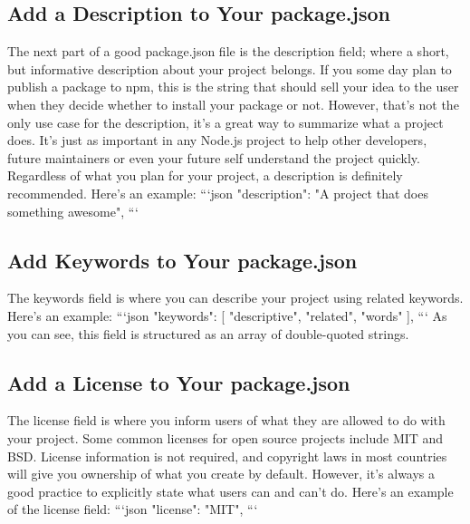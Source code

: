 \documentclass{article}%
\begin{document}
\subsection{Add a Description to Your package.json}%
\label{subsec:AddaDescriptiontoYourpackage.json}%
The next part of a good package.json file is the description field; where a short, but informative description about your project belongs.\newline%
If you some day plan to publish a package to npm, this is the string that should sell your idea to the user when they decide whether to install your package or not. However, that’s not the only use case for the description, it’s a great way to summarize what a project does. It’s just as important in any Node.js project to help other developers, future maintainers or even your future self understand the project quickly.\newline%
Regardless of what you plan for your project, a description is definitely recommended. Here's an example:\newline%
```json\newline%
"description": "A project that does something awesome",\newline%
```\newline%

%
\subsection{Add Keywords to Your package.json}%
\label{subsec:AddKeywordstoYourpackage.json}%
The keywords field is where you can describe your project using related keywords. Here's an example:\newline%
```json\newline%
"keywords": {[} "descriptive", "related", "words" {]},\newline%
```\newline%
As you can see, this field is structured as an array of double{-}quoted strings.\newline%

%
\subsection{Add a License to Your package.json}%
\label{subsec:AddaLicensetoYourpackage.json}%
The license field is where you inform users of what they are allowed to do with your project.\newline%
Some common licenses for open source projects include MIT and BSD. License information is not required, and copyright laws in most countries will give you ownership of what you create by default. However, it’s always a good practice to explicitly state what users can and can’t do. Here's an example of the license field:\newline%
```json\newline%
"license": "MIT",\newline%
```\newline%
\end{document}

